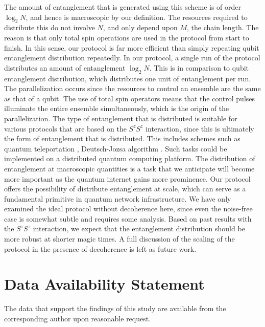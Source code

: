 \documentclass{WileyMSP-template}
\begin{document}
{The amount of entanglement that is generated using this scheme is of order $ \log_2 N$, and hence is macroscopic by our definition.   The resources required to distribute this do not involve $ N $, and only depend upon $ M $, the chain length.  The reason is that only total spin operations are used in the protocol from start to finish. In this sense, our protocol is far more efficient than simply repeating qubit entanglement distribution repeatedly.  In our protocol, a single run of the protocol distributes an amount of entanglement $ \log_2 N$.  This is in comparison to qubit entanglement distribution, which distributes one unit of entanglement per run.    The parallelization occurs since the resources to control an ensemble are the same as that of a qubit. The use of total spin operators means that the control pulses illuminate the entire ensemble simultaneously, which is the origin of the parallelization.  The type of entanglement that is distributed is suitable for various protocols that are based on the $ S^z S^z $ interaction, since this is ultimately the form of entanglement that is distributed.  This includes schemes such as quantum teleportation \cite{pyrkov2014quantum,pyrkov2014full}, Deutsch-Jozsa algorithm \cite{semenenko2016implementing}. Such tasks could be implemented on a distributed quantum computing platform.  The distribution of entanglement at macroscopic quantities is a task that we anticipate will become more important as the quantum internet gains more prominence.  Our protocol offers the possibility of distribute entanglement at scale, which can serve as a fundamental primitive in quantum network infrastructure.  We have only examined the ideal protocol without decoherence here, since even the noise-free case is somewhat subtle and requires some analysis.  Based on past results with the $ S^z S^z $ interaction, we expect that the entanglement distribution should be more robust at shorter magic times.  A full discussion of the scaling of the protocol in the presence of decoherence is left as future work.










\section{Data Availability Statement}

The data that support the findings of this study are available from the corresponding author upon reasonable request.


}
\end{document}
